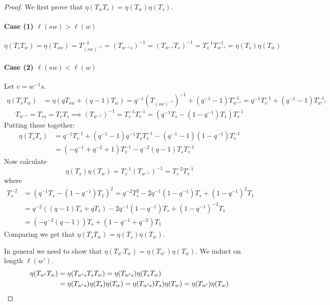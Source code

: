 \begin{proof}
	We first prove that $\eta(T_wT_s)=\eta(T_w)\eta(T_s)$.
	
	\paragraph{Case (1) $\ell(sw)>\ell(w)$}
	\[\eta(T_sT_w)=\eta(T_{sw})=T^{-1}_{(sw)^{-1}}=\left(T_{w^{-1}s}\right)^{-1}=\left(T_{w^{-1}}T_s\right)^{-1}=T_s^{-1}T_{w^{-1}}^{-1}=\eta(T_s)\eta(T_w)\]
	\paragraph{Case (2) $\ell(sw)<\ell(w)$} Let $v=w^{-1}s$.
	\begin{align*}
	\eta(T_sT_w)&=\eta(qT_{sw}+(q-1)T_w)=q^{-1}\left(T_{(sw)^{-1}}\right)^{-1}+(q^{-1}-1)T_{w^{-1}}^{-1}=q^{-1}T_v^{-1}+(q^{-1}-1) T_{w^{-1}}^{-1}
	\end{align*}
	\[T_{w^{-1}}=T_{vs}=T_vT_s\implies \left(T_{w^{-1}}\right)^{-1}=T_s^{-1}T_v^{-1}=\left(q^{-1}T_s-(1-q^{-1})T_1\right)T_v^{-1}\]
	Putting these together:
	\begin{align*}\eta(T_sT_s)&=q^{-1}T_v^{-1}+(q^{-1}-1)q^{-1}T_sT_v^{-1}-(q^{-1}-1)(1-q^{-1})T_v^{-1}\\
	&=(-q^{-1}+q^{-2}+1)T_v^{-1}-q^{-2}(q-1)T_sT_v^{-1}\end{align*}
	Now calculate
	\[\eta(T_s)\eta(T_w)=T_s^{-1}(T_{w^{-1}})^{-1}=T_s^{-2}T_v^{-1}\]
	where
	\begin{align*}T_s^{-2}&=(q^{-1}T_s-(1-q^{-1})T_1)^{2}=q^{-2}T_s^2-2q^{-1}(1-q^{-1})T_s+(1-q^{-1})^2T_1\\
	&=q^{-2}((q-1)T_s+qT_1)-2q^{-1}(1-q^{-1})T_s+(1-q^{-1})^{-2}T_1\\
	&=(-q^{-2}(q-1))T_s+(1-q^{-1}+q^{-2})T_1
	\end{align*}
	Comparing we get that $\eta(T_sT_w)=\eta(T_s)\eta(T_w)$.
	
	In general we need to show that $\eta(T_{w'}T_w)=\eta(T_{w'})\eta(T_w)$. We induct on length $\ell(w')$.
	\begin{align*}
		\eta(T_{w'}T_w)&=\eta(T_{w's}T_sT_w)
		=\eta(T_{w's})\eta(T_sT_w)\\&=\eta(T_{w's})\eta(T_s)\eta(T_w)=\eta(T_{w's})T_s)\eta(T_w)=\eta(T_{w'})\eta(T_w)\qedhere
	\end{align*}

	

\end{proof}